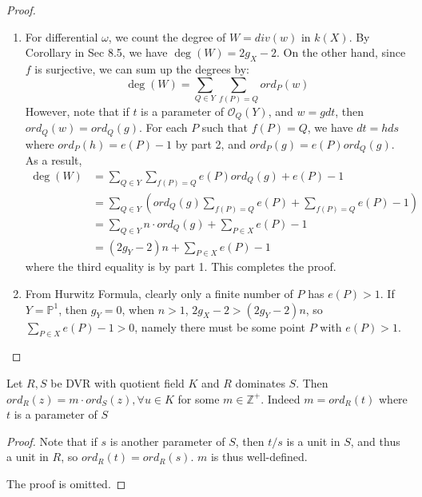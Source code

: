 \documentclass{solution}
\begin{document}
\begin{proof}
\begin{enumerate}
        \item For differential $\omega$, we count the degree of $W = div(w)$ in $k(X)$. By Corollary in Sec 8.5, we have $\deg(W) = 2g_X - 2$. On the other hand, since $f$ is surjective, we can sum up the degrees by:
        $$\deg(W) = \sum\limits_{Q \in Y} \sum\limits_{f(P) = Q} ord_P(w)$$
        However, note that if $t$ is a parameter of $\mathcal{O}_{Q}(Y)$, and $w = g dt$, then $ord_Q(w) = ord_Q(g)$. For each $P$ such that $f(P) = Q$, we have $dt = h ds$ where $ord_P(h) = e(P) - 1$ by part 2, and $ord_P(g) = e(P) ord_Q(g)$. As a result,
        $$
            \begin{aligned}
            \deg(W) &= \sum\limits_{Q \in Y} \sum\limits_{f(P) = Q} e(P) ord_Q(g) + e(P) - 1 \\
            &= \sum\limits_{Q \in Y} \left(ord_Q(g) \sum\limits_{f(P) = Q} e(P) + \sum\limits_{f(P) = Q} e(P) - 1\right)\\
            &= \sum\limits_{Q \in Y} n \cdot ord_Q(g) + \sum\limits_{P \in X} e(P) - 1 \\
            &= (2g_Y - 2) n + \sum\limits_{P \in X} e(P) - 1
            \end{aligned}
        $$
        where the third equality is by part 1. This completes the proof.

        \item From Hurwitz Formula, clearly only a finite number of $P$ has $e(P) \gt 1$. If $Y = \mathbb{P}^1$, then $g_Y = 0$, when $n \gt 1$, $2g_X - 2 \gt (2g_Y - 2) n$, so $\sum\limits_{P \in X} e(P) - 1 \gt 0$, namely there must be some point $P$ with $e(P) \gt 1$.
    \end{enumerate}
\end{proof}

\begin{lemma}
    Let $R, S$ be DVR with quotient field $K$ and $R$ dominates $S$. Then $ord_R(z) = m \cdot ord_S(z), \forall u \in K$ for some $m \in \mathbb{Z}^+$. Indeed $m = ord_R(t)$ where $t$ is a parameter of $S$
\end{lemma}

\begin{proof}
    Note that if $s$ is another parameter of $S$, then $t / s$ is a unit in $S$, and thus a unit in $R$, so $ord_R(t) = ord_R(s)$. $m$ is thus well-defined.

    The proof is omitted.
\end{proof}
\end{document}
